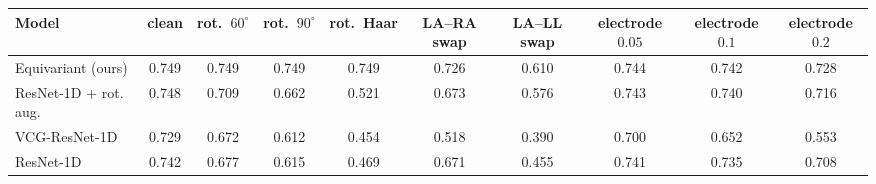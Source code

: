 \begin{tabular}{lccccccccc}
\toprule
Model & clean & rot.\ $60^\circ$ & rot.\ $90^\circ$ & rot.\ Haar & LA--RA swap & LA--LL swap & electrode $0.05$ & electrode $0.1$ & electrode $0.2$ \\
\midrule
  Equivariant (ours) & 0.749 & 0.749 & 0.749 & 0.749 & 0.726 & 0.610 & 0.744 & 0.742 & 0.728 \\
  ResNet-1D + rot. aug. & 0.748 & 0.709 & 0.662 & 0.521 & 0.673 & 0.576 & 0.743 & 0.740 & 0.716 \\
  VCG-ResNet-1D & 0.729 & 0.672 & 0.612 & 0.454 & 0.518 & 0.390 & 0.700 & 0.652 & 0.553 \\
  ResNet-1D & 0.742 & 0.677 & 0.615 & 0.469 & 0.671 & 0.455 & 0.741 & 0.735 & 0.708 \\
\bottomrule
\end{tabular}